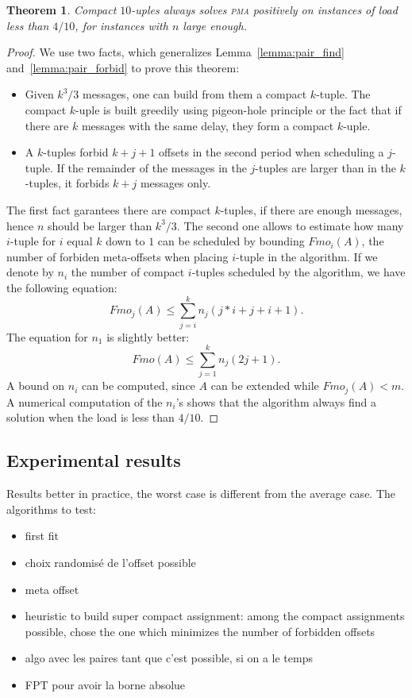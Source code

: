 \documentclass[10pt, conference, letterpaper]{IEEEtran}
\newtheorem{theorem}{Theorem}
\newcommand\pma{\textsc{pma}\xspace}
\begin{document}
\begin{theorem}
Compact $10$-uples always solves \pma positively on instances of load less than $4/10$, for instances with $n$ large enough.
\end{theorem}
\begin{proof}
We use two facts, which generalizes Lemma~\ref{lemma:pair_find} and~\ref{lemma:pair_forbid} to prove this theorem:
\begin{itemize}
\item Given $ k^3/3$ messages, one can build from them a compact $k$-tuple. 
The compact $k$-uple is built greedily using pigeon-hole principle or the fact that if there are $k$ messages with the same delay, they form a compact $k$-uple.
\item A $k$-tuples forbid $k+j+1$ offsets in the second period when scheduling a 
$j$-tuple. If the remainder of the messages in the $j$-tuples are larger than in the $k$-tuples, it forbids $k+j$ messages only.
\end{itemize}

The first fact garantees there are compact $k$-tuples, if there are enough messages,
hence $n$ should be larger than $k^3/3$.
The second one allows to estimate how many $i$-tuple for $i$ equal $k$ down to $1$ can be scheduled by bounding $Fmo_i(A)$, the number of forbiden meta-offsets when placing $i$-tuple in the algorithm.
If we denote by $n_i$ the number of compact $i$-tuples scheduled by the algorithm,
we have the following equation:  $$ Fmo_j(A) \leq \displaystyle{\sum_{j=i}^k n_j(j*i + j + i+ 1)}.$$
The equation for $n_1$ is slightly better: 
$$ Fmo(A) \leq \displaystyle{\sum_{j=1}^k n_j(2j + 1)}.$$
A bound on $n_i$ can be computed, since $A$ can be extended while $Fmo_j(A) < m$. A numerical computation of the $n_i$'s shows that the algorithm always find a solution when the load is less than $4/10$.
\end{proof}


\subsection{Experimental results}

Results better in practice, the worst case is different from the 
average case.
The algorithms to test:
\begin{itemize}
	\item first fit
	\item choix randomisé de l'offset possible
	\item meta offset
	\item heuristic to build super compact assignment: among the compact assignments
possible, chose the one which minimizes the number of forbidden offsets
	\item algo avec les paires tant que c'est possible, si on a le temps
	\item FPT pour avoir la borne absolue
\end{itemize}
\end{document}
